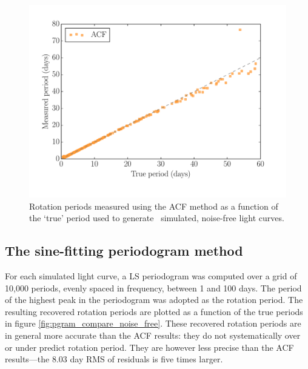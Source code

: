 \begin{figure}
\begin{center}
\includegraphics[width=6in, clip=true]{figures/compare_acf.pdf}
\caption[ACF results.]
{Rotation periods measured using the ACF method as a function of the
`true' period used to generate \nlightcurves\ simulated, noise-free light
curves.}
\end{center}
\end{figure}
\label{fig:compare_noise_free}

\subsection{The sine-fitting periodogram method}

For each simulated light curve, a LS periodogram was computed over a grid of
10,000 periods, evenly spaced in frequency, between 1 and 100 days.
The period of the highest peak in the periodogram was adopted as the rotation
period.
The resulting recovered rotation periods are plotted as a function of the true
periods in figure \ref{fig:pgram_compare_noise_free}.
These recovered rotation periods are in general more accurate than the ACF
results: they do not systematically over or under predict rotation period.
They are however less precise than the ACF results---the 8.03 day RMS of
residuals is five times larger.

